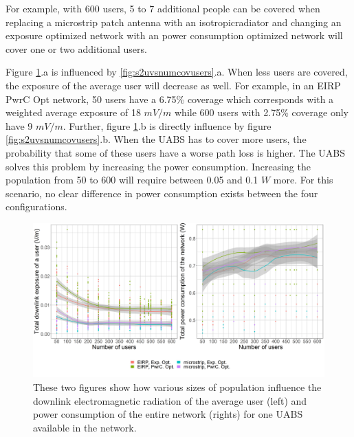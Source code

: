 \documentclass[twocolumn]{phdsymp} %
\begin{document}
For example, with 600 users, 5 to 7 additional 
people can be covered when replacing a microstrip patch antenna with an \gls{isotropicradiator}
and changing an exposure optimized network with an power consumption optimized network will 
cover one or two additional users.


\FloatBarrier
Figure  \ref{fig:s2b_dlAndPc}.a  is influenced by  \ref{fig:s2uvsnumcovusers}.a. When less users are 
covered, the exposure of the average user will decrease as well.
For example, in an EIRP \gls{PwrC Opt} network, 50 users have a 6.75\% coverage which corresponds with a weighted average exposure of  18 $mV/m$
while 600 users with 2.75\% coverage only have 9 $mV/m$.
Further,  figure \ref{fig:s2b_dlAndPc}.b is directly influence by figure \ref{fig:s2uvsnumcovusers}.b. When the \gls{UABS} has to cover more users,
the probability that some of these users have a worse path loss is higher. The \gls{UABS} solves this problem by increasing the 
power consumption. Increasing the population from 50 to 600 will require between 0.05 and 0.1 $W$ more. 
For this scenario, no clear difference in power consumption exists between the four configurations.
\begin{figure}[h!]
  \includegraphics[width=\linewidth]{s2/uvsdlAndPc.png}
  \caption{These two figures show how various sizes of population influence the downlink electromagnetic radiation of the average user (left) and 
  power consumption of the entire network (rights) for one \acs{UABS} available in the network.}
  \label{fig:s2b_dlAndPc}
\end{figure}
\end{document}
